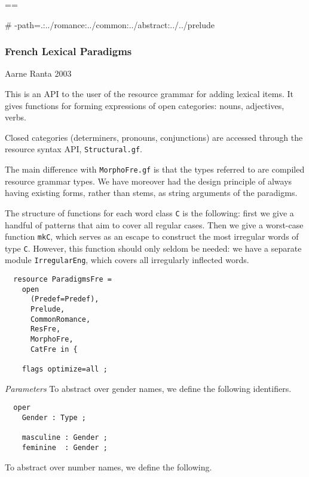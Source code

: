 \documentclass[11pt,a4paper]{article}
\newcommand{\commOut}[1]{}
\newcommand{\subsubsubsection}[1]{\textit{#1}}
\begin{document}
\commOut{Produced by 
gfdoc - a rudimentary GF document generator.
(c) Aarne Ranta (\htmladdnormallink{aarne@cs.chalmers.se}{mailto:aarne@cs.chalmers.se}) 2002 under GNU GPL.}

==

\# -path=.:../romance:../common:../abstract:../../prelude


\subsubsection{French Lexical Paradigms}
Aarne Ranta 2003

This is an API to the user of the resource grammar 
for adding lexical items. It gives functions for forming
expressions of open categories: nouns, adjectives, verbs.

Closed categories (determiners, pronouns, conjunctions) are
accessed through the resource syntax API, \texttt{Structural.gf}. 

The main difference with \texttt{MorphoFre.gf} is that the types
referred to are compiled resource grammar types. We have moreover
had the design principle of always having existing forms, rather
than stems, as string arguments of the paradigms.

The structure of functions for each word class \texttt{C} is the following:
first we give a handful of patterns that aim to cover all
regular cases. Then we give a worst-case function \texttt{mkC}, which serves as an
escape to construct the most irregular words of type \texttt{C}.
However, this function should only seldom be needed: we have a
separate module \texttt{IrregularEng}, which covers all irregularly inflected
words.

\begin{verbatim}
  resource ParadigmsFre = 
    open 
      (Predef=Predef), 
      Prelude, 
      CommonRomance, 
      ResFre, 
      MorphoFre, 
      CatFre in {
  
    flags optimize=all ;
\end{verbatim}

\subsubsubsection{Parameters}
To abstract over gender names, we define the following identifiers.

\begin{verbatim}
  oper
    Gender : Type ; 
  
    masculine : Gender ;
    feminine  : Gender ;
\end{verbatim}

To abstract over number names, we define the following.
\end{document}
